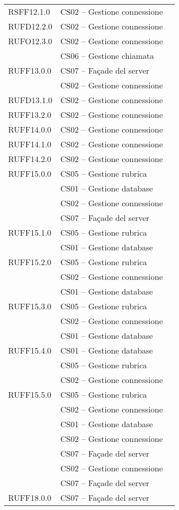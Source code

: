 \begin{center}
\begin{longtable}{lp{}l}
RSFF12.1.0 & CS02 -- Gestione connessione \\
RUFD12.2.0 & CS02 -- Gestione connessione \\
RUFO12.3.0 & CS02 -- Gestione connessione \\
  & CS06 -- Gestione chiamata \\
RUFF13.0.0 & CS07 -- Façade del server \\
 & CS02 -- Gestione connessione \\
RUFD13.1.0 & CS02 -- Gestione connessione \\
RUFF13.2.0 & CS02 -- Gestione connessione \\
RUFF14.0.0 & CS02 -- Gestione connessione \\
RUFF14.1.0 & CS02 -- Gestione connessione \\
RUFF14.2.0 & CS02 -- Gestione connessione \\
RUFF15.0.0 & CS05 -- Gestione rubrica \\
 & CS01 -- Gestione database \\
 & CS02 -- Gestione connessione \\
 & CS07 -- Façade del server \\
RUFF15.1.0 & CS05 -- Gestione rubrica \\
 & CS01 -- Gestione database \\
RUFF15.2.0 & CS05 -- Gestione rubrica \\
 & CS02 -- Gestione connessione \\
 & CS01 -- Gestione database \\
RUFF15.3.0 & CS05 -- Gestione rubrica \\
 & CS02 -- Gestione connessione \\
 & CS01 -- Gestione database \\
RUFF15.4.0 & CS01 -- Gestione database \\
 & CS05 -- Gestione rubrica \\
 & CS02 -- Gestione connessione \\
RUFF15.5.0 & CS05 -- Gestione rubrica \\
 & CS02 -- Gestione connessione \\
 & CS01 -- Gestione database \\
 & CS02 -- Gestione connessione \\
 & CS07 -- Façade del server \\
 & CS02 -- Gestione connessione \\
 & CS07 -- Façade del server \\
RUFF18.0.0 & CS07 -- Façade del server \\

\end{longtable}
\end{center}
